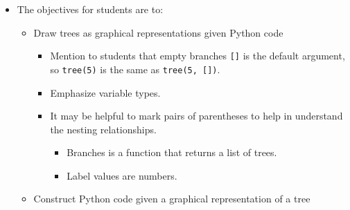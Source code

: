 \begin{guide}
\begin{itemize}
\begin{itemize}
			\end{itemize}
			\item The objectives for students are to:
			\begin{itemize}
				\item Draw trees as graphical representations given Python code
				\begin{itemize}
					\item Mention to students that empty branches \lstinline{[]} is the default argument, so \lstinline{tree(5)} is the same as \lstinline{tree(5, [])}.
					\item Emphasize variable types.
					\item It may be helpful to mark pairs of parentheses to help in understand the nesting relationships.
					\begin{itemize}
						\item Branches is a function that returns a list of trees.
						\item Label values are numbers.
					\end{itemize}
				\end{itemize}
				\item Construct Python code given a graphical representation of a tree
			\end{itemize}
	\end{itemize}
\end{guide}
